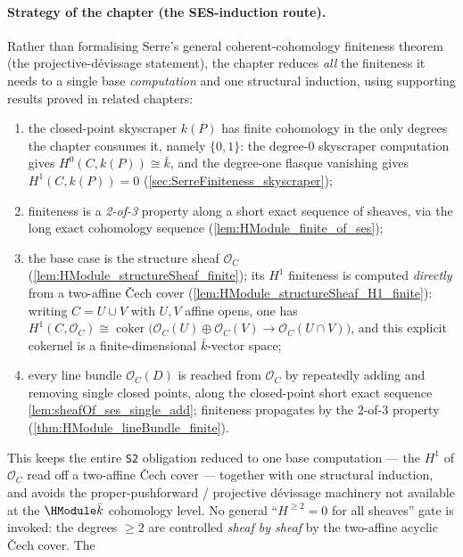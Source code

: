 \paragraph{Strategy of the chapter (the SES-induction route).} Rather
than formalising Serre's general coherent-cohomology finiteness theorem
(the projective-dévissage statement), the chapter reduces \emph{all} the
finiteness it needs to a single base \emph{computation} and one
structural induction, using supporting results proved in related
chapters:
\begin{enumerate}
  \item the closed-point skyscraper \(k(P)\) has finite cohomology in
    the only degrees the chapter consumes it, namely \(\{0, 1\}\): the
    degree-\(0\) skyscraper computation gives \(H^0(C, k(P)) \cong
    \bar k\), and the degree-one flasque vanishing gives
    \(H^1(C, k(P)) = 0\)
    (\cref{sec:SerreFiniteness_skyscraper});
  \item finiteness is a \emph{2-of-3} property along a short exact
    sequence of sheaves, via the long exact cohomology sequence
    (\cref{lem:HModule_finite_of_ses});
  \item the base case is the structure sheaf \(\mathcal O_C\)
    (\cref{lem:HModule_structureSheaf_finite}); its \(H^1\) finiteness
    is computed \emph{directly} from a two-affine Čech cover
    (\cref{lem:HModule_structureSheaf_H1_finite}): writing
    \(C = U \cup V\) with \(U, V\) affine opens, one has
    \(H^1(C, \mathcal O_C) \cong
    \operatorname{coker}\bigl(\mathcal O_C(U) \oplus \mathcal O_C(V)
    \to \mathcal O_C(U \cap V)\bigr)\), and this explicit cokernel is a
    finite-dimensional \(\bar k\)-vector space;
  \item every line bundle \(\mathcal O_C(D)\) is reached from
    \(\mathcal O_C\) by repeatedly adding and removing single closed
    points, along the closed-point short exact sequence
    \cref{lem:sheafOf_ses_single_add}; finiteness propagates by the
    2-of-3 property (\cref{thm:HModule_lineBundle_finite}).
\end{enumerate}
This keeps the entire \texttt{S2} obligation reduced to one base
computation --- the \(H^1\) of \(\mathcal O_C\) read off a two-affine
Čech cover --- together with one structural induction, and avoids the
proper-pushforward / projective dévissage machinery not available at the
\(\HModule \bar k\) cohomology level. No general ``\(H^{\ge 2} = 0\) for
all sheaves'' gate is invoked: the degrees \(\ge 2\) are controlled
\emph{sheaf by sheaf} by the two-affine acyclic Čech cover. The

